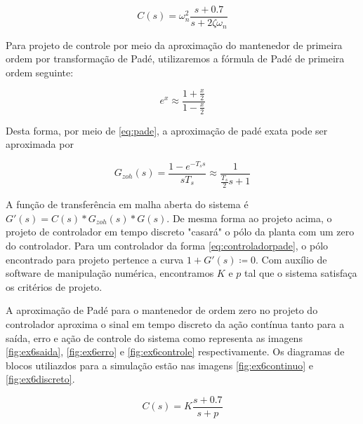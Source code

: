         \begin{equation}
            C(s) = \omega_n^2 \frac{s + 0.7}{s + 2 \zeta \omega_n}
        \end{equation}
        
    Para projeto de controle por meio da aproximação do mantenedor de primeira ordem por transformação de Padé, utilizaremos a fórmula de Padé de primeira ordem seguinte:
    
    \begin{equation}
    e^{x} \approx \frac{1 + \frac{x}{2}}{1 - \frac{x}{2}}
    \label{eq:pade}
    \end{equation}
    
    Desta forma, por meio de \eqref{eq:pade}, a aproximação de padé exata pode ser aproximada por
    
    \begin{equation}
    G_{zoh}(s) = \frac{1 - e^{-T_s s}}{s T_s} \approx \frac{1}{\frac{T_s}{2} s + 1}
    \end{equation}
    
    A função de transferência em malha aberta do sistema é $G'(s) = C(s)*G_{zoh}(s)*G(s)$. De mesma forma ao projeto acima, o projeto de controlador em tempo discreto "casará" o pólo da planta com um zero do controlador. Para um controlador da forma \eqref{eq:controladorpade}, o pólo encontrado para projeto pertence a curva $1 + G'(s) \coloneqq 0$.   Com auxílio de software de manipulação numérica, encontramos $K$ e $p$ tal que o sistema satisfaça os critérios de  projeto. 
    
    A aproximação de Padé para o mantenedor de ordem zero no projeto do controlador aproxima o sinal em tempo discreto da ação contínua tanto para a saída, erro e ação de controle do sistema como representa as imagens \ref{fig:ex6saida}, \ref{fig:ex6erro} e \ref{fig:ex6controle}  respectivamente. Os diagramas de blocos utiliazdos para a simulação estão nas imagens \ref{fig:ex6continuo} e \ref{fig:ex6discreto}.
    
    \begin{equation}
    \label{eq:controladorpade}
        C(s) = K \frac{s + 0.7}{s + p}
    \end{equation}
    
